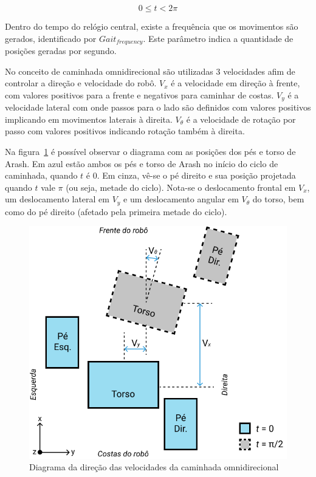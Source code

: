 \begin{equation}
	\label{eq:math:centraclock}
	0 \leq t < 2\pi
\end{equation}

Dentro do tempo do relógio central, existe a frequência que os movimentos são gerados, identificado por $Gait_{frequency}$. Este parâmetro indica a quantidade de posições geradas por segundo.

No conceito de caminhada omnidirecional são utilizadas 3 velocidades afim de controlar a direção e velocidade do robô. $V_x$ é a velocidade em direção à frente, com valores positivos para a frente e negativos para caminhar de costas. $V_y$ é a velocidade lateral com onde passos para o lado são definidos com valores positivos implicando em movimentos laterais à direita. $V_\theta$ é a velocidade de rotação por passo com valores positivos indicando rotação também à direita.

Na figura~\ref{fig:math:velocities} é possível observar o diagrama com as posições dos pés e torso de Arash. Em azul estão ambos os pés e torso de Arash no início do ciclo de caminhada, quando $t$ é $0$. Em cinza, vê-se o pé direito e sua posição projetada quando $t$ vale $\pi$ (ou seja, metade do ciclo). Nota-se o deslocamento frontal em $V_x$, um deslocamento lateral em $V_y$ e um deslocamento angular em $V_\theta$ do torso, bem como do pé direito (afetado pela primeira metade do ciclo).

\begin{figure}[htb]
	\centering
	\includegraphics[scale=1]{imagens/svg/velocities-diagram}
	\caption{Diagrama da direção das velocidades da caminhada omnidirecional}
	\label{fig:math:velocities}
\end{figure}

